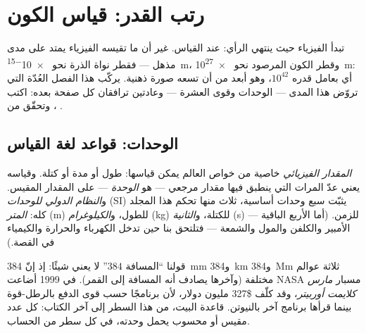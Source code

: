 \chapter{رتب القدر: قياس الكون}\label{ch:g10:orders-of-magnitude}

تبدأ الفيزياء حيث ينتهي الرأي: عند القياس. غير أن ما تقيسه الفيزياء
يمتد على مدى مذهل --- فقطر نواة الذرة نحو
\qty{e-15}{m}، وقطر الكون المرصود نحو \qty{e27}{m}: أي بعامل
قدره $10^{42}$، وهو أبعد من أن تسعه صورة ذهنية.
يركّب هذا الفصل العُدّة التي تروّض هذا المدى --- الوحدات
وقوى العشرة  --- وعادتين ترافقان كل
صفحة بعده: اكتب ، وتحقّق من .

\section{الوحدات: قواعد لغة القياس}

\begin{definition}\label{def:g10:orders-of-magnitude:unit}
\emph{المقدار الفيزيائي} خاصية من خواص
العالم يمكن قياسها: طول أو مدة أو كتلة.
وقياسه يعني عدّ المرات التي ينطبق فيها مقدار مرجعي ---
هو \emph{الوحدة} --- على المقدار المقيس.
و\emph{النظام الدولي للوحدات} (SI) يثبّت سبع وحدات أساسية،
ثلاث منها تحكم هذا المجلد كله: \emph{المتر} (\unit{m}) للطول،
و\emph{الكيلوغرام} (\unit{kg}) للكتلة،
و\emph{الثانية} (\unit{s}) للزمن. (أما الأربع الباقية ---
الأمبير والكلفن والمول والشمعة --- فتلتحق بنا حين تدخل الكهرباء والحرارة
والكيمياء في القصة.)
\end{definition}

\begin{remark}\label{rem:g10:orders-of-magnitude:units}
قولنا ``المسافة $384$'' لا يعني شيئًا: إذ إنّ \qty{384}{mm}
و\qty{384}{km} و\qty{384}{Mm} ثلاثة عوالم مختلفة (وآخرها
يصادف أنه المسافة إلى القمر). في 1999 أضاعت NASA مسبار \emph{مارس كلايمت أوربيتر}،
وقد كلّف \$327 مليون دولار، لأن برنامجًا حسب
قوى الدفع بالرطل-قوة بينما قرأها برنامج آخر بالنيوتن.
قاعدة البيت، من هذا السطر إلى آخر الكتاب: كل عدد مقيس أو
محسوب يحمل وحدته، في كل سطر من الحساب.
\end{remark}

